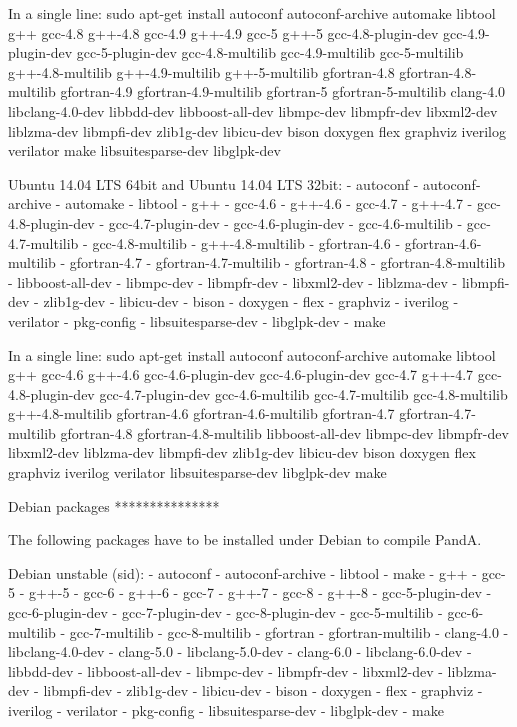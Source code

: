 \begin{DoxyVerbInclude}
In a single line:
sudo apt-get install autoconf autoconf-archive automake libtool g++ gcc-4.8 g++-4.8 gcc-4.9 g++-4.9 gcc-5 g++-5 gcc-4.8-plugin-dev gcc-4.9-plugin-dev gcc-5-plugin-dev  gcc-4.8-multilib gcc-4.9-multilib gcc-5-multilib g++-4.8-multilib g++-4.9-multilib g++-5-multilib gfortran-4.8 gfortran-4.8-multilib gfortran-4.9 gfortran-4.9-multilib gfortran-5 gfortran-5-multilib clang-4.0 libclang-4.0-dev libbdd-dev libboost-all-dev libmpc-dev libmpfr-dev libxml2-dev liblzma-dev libmpfi-dev zlib1g-dev libicu-dev bison doxygen flex graphviz iverilog verilator make libsuitesparse-dev libglpk-dev


Ubuntu 14.04 LTS 64bit and Ubuntu 14.04 LTS 32bit:
- autoconf
- autoconf-archive
- automake
- libtool
- g++
- gcc-4.6
- g++-4.6
- gcc-4.7
- g++-4.7
- gcc-4.8-plugin-dev
- gcc-4.7-plugin-dev
- gcc-4.6-plugin-dev
- gcc-4.6-multilib
- gcc-4.7-multilib
- gcc-4.8-multilib
- g++-4.8-multilib
- gfortran-4.6
- gfortran-4.6-multilib
- gfortran-4.7
- gfortran-4.7-multilib
- gfortran-4.8
- gfortran-4.8-multilib
- libboost-all-dev
- libmpc-dev
- libmpfr-dev
- libxml2-dev
- liblzma-dev
- libmpfi-dev
- zlib1g-dev
- libicu-dev
- bison
- doxygen
- flex
- graphviz
- iverilog
- verilator
- pkg-config
- libsuitesparse-dev
- libglpk-dev
- make


In a single line:
sudo apt-get install autoconf autoconf-archive automake libtool g++ gcc-4.6 g++-4.6 gcc-4.6-plugin-dev gcc-4.6-plugin-dev gcc-4.7 g++-4.7 gcc-4.8-plugin-dev gcc-4.7-plugin-dev gcc-4.6-multilib gcc-4.7-multilib gcc-4.8-multilib g++-4.8-multilib gfortran-4.6 gfortran-4.6-multilib gfortran-4.7 gfortran-4.7-multilib gfortran-4.8 gfortran-4.8-multilib libboost-all-dev libmpc-dev libmpfr-dev libxml2-dev liblzma-dev libmpfi-dev zlib1g-dev libicu-dev bison doxygen flex graphviz iverilog verilator libsuitesparse-dev libglpk-dev make

Debian packages
***************

The following packages have to be installed under Debian to compile PandA.

Debian unstable (sid):
- autoconf
- autoconf-archive
- libtool
- make
- g++
- gcc-5
- g++-5
- gcc-6
- g++-6
- gcc-7
- g++-7
- gcc-8
- g++-8
- gcc-5-plugin-dev
- gcc-6-plugin-dev
- gcc-7-plugin-dev
- gcc-8-plugin-dev
- gcc-5-multilib
- gcc-6-multilib
- gcc-7-multilib
- gcc-8-multilib
- gfortran
- gfortran-multilib 
- clang-4.0
- libclang-4.0-dev
- clang-5.0
- libclang-5.0-dev
- clang-6.0
- libclang-6.0-dev
- libbdd-dev
- libboost-all-dev
- libmpc-dev
- libmpfr-dev
- libxml2-dev
- liblzma-dev
- libmpfi-dev
- zlib1g-dev
- libicu-dev
- bison
- doxygen
- flex
- graphviz
- iverilog
- verilator
- pkg-config
- libsuitesparse-dev
- libglpk-dev
- make


\end{DoxyVerbInclude}
